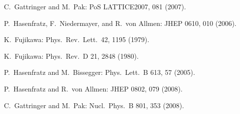 \begin{enumerate}[label={[\arabic*]}]
  \item C.~Gattringer and M.~Pak: PoS LATTICE2007, 081 (2007).
  \item P.~Hasenfratz, F.~Niedermayer, and R.~von Allmen: JHEP 0610, 010 (2006).
  \item K.~Fujikawa: Phys.\ Rev.\ Lett.\ 42, 1195 (1979).
  \item K.~Fujikawa: Phys.\ Rev.\ D 21, 2848 (1980).
  \item P.~Hasenfratz and M.~Bissegger: Phys.\ Lett.\ B 613, 57 (2005).
  \item P.~Hasenfratz and R.~von Allmen: JHEP 0802, 079 (2008).
  \item C.~Gattringer and M.~Pak: Nucl.\ Phys.\ B 801, 353 (2008).
\end{enumerate}

